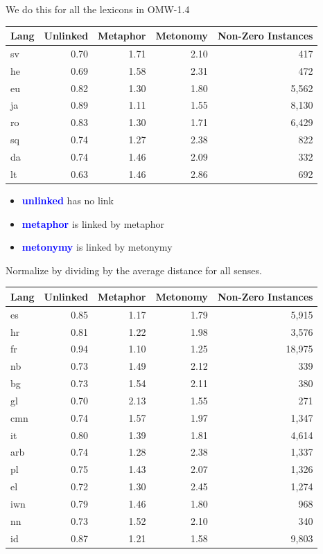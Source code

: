 \documentclass[xetex]{beamer}  %
\newcommand{\txx}[1]{\textbf{\textcolor{blue}{#1}}}
\begin{document}
\begin{frame}[allowframebreaks]{We do this for all the lexicons in OMW-1.4}

 
  \begin{center}
  \begin{tabular}{lrrrr}
    Lang & Unlinked & Metaphor & Metonomy & Non-Zero Instances \\ \hline
sv & 0.70 & 1.71 & 2.10 & 417   \\
he & 0.69 & 1.58 & 2.31 & 472   \\
eu & 0.82 & 1.30 & 1.80 & 5,562  \\
ja & 0.89 & 1.11 & 1.55 & 8,130 \\
ro & 0.83 & 1.30 & 1.71 & 6,429 \\
sq & 0.74 & 1.27 & 2.38 & 822 \\
da & 0.74 & 1.46 & 2.09 & 332 \\
lt & 0.63 & 1.46 & 2.86 & 692 \\
 \end{tabular}
\end{center}

\begin{itemize}
\item \txx{unlinked} has no link
\item \txx{metaphor} is linked by metaphor
\item \txx{metonymy} is linked by metonymy
\end{itemize}
Normalize by dividing  by the average distance for all senses.

  \begin{center}
  \begin{tabular}{lrrrr}
    Lang & Unlinked & Metaphor & Metonomy & Non-Zero Instances \\ \hline
es & 0.85 & 1.17 & 1.79 & 5,915 \\
 hr & 0.81 & 1.22 & 1.98 & 3,576 \\
    fr & 0.94 & 1.10 & 1.25 & 18,975 \\
nb & 0.73 & 1.49 & 2.12 & 339 \\
bg & 0.73 & 1.54 & 2.11 & 380 \\
gl & 0.70 & 2.13 & 1.55 & 271 \\
cmn & 0.74 & 1.57 & 1.97 & 1,347 \\
it & 0.80 & 1.39 & 1.81 & 4,614 \\
arb & 0.74 & 1.28 & 2.38 & 1,337 \\
pl & 0.75 & 1.43 & 2.07 & 1,326 \\
el & 0.72 & 1.30 & 2.45 & 1,274 \\
iwn & 0.79 & 1.46 & 1.80 & 968 \\
nn & 0.73 & 1.52 & 2.10 & 340 \\
id & 0.87 & 1.21 & 1.58 & 9,803 \\
  \end{tabular}
\end{center}


\end{frame}
\end{document}
